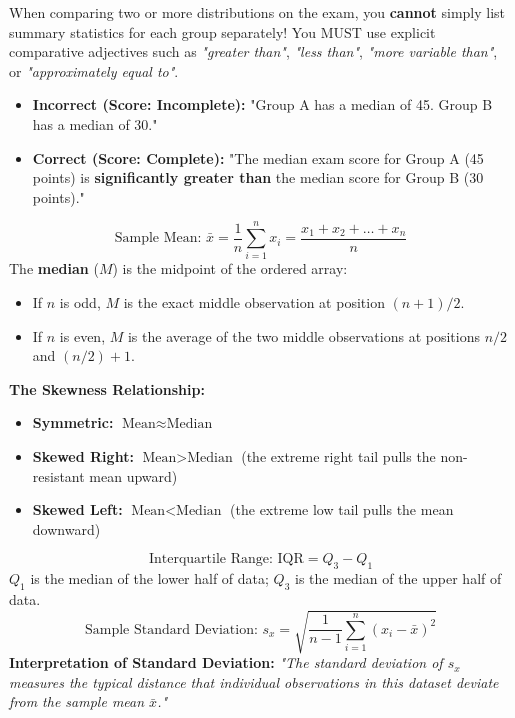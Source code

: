 \begin{trapbox}
When comparing two or more distributions on the exam, you \textbf{cannot} simply list summary statistics for each group separately! You MUST use explicit comparative adjectives such as \textit{"greater than"}, \textit{"less than"}, \textit{"more variable than"}, or \textit{"approximately equal to"}.
\begin{itemize}[leftmargin=1.2em]
  \item \textbf{Incorrect (Score: Incomplete):} "Group A has a median of 45. Group B has a median of 30."
  \item \textbf{Correct (Score: Complete):} "The median exam score for Group A (45 points) is \textbf{significantly greater than} the median score for Group B (30 points)."
\end{itemize}
\end{trapbox}

\begin{lessonbox}
\begin{equation}
  \text{Sample Mean: } \bar{x} = \frac{1}{n} \sum_{i=1}^n x_i = \frac{x_1 + x_2 + \dots + x_n}{n}
\end{equation}
The \textbf{median} ($M$) is the midpoint of the ordered array:
\begin{itemize}[leftmargin=1.2em]
  \item If $n$ is odd, $M$ is the exact middle observation at position $(n+1)/2$.
  \item If $n$ is even, $M$ is the average of the two middle observations at positions $n/2$ and $(n/2)+1$.
\end{itemize}
\textbf{The Skewness Relationship:}
\begin{itemize}[leftmargin=1.2em]
  \item \textbf{Symmetric:} $\text{Mean} \approx \text{Median}$
  \item \textbf{Skewed Right:} $\text{Mean} > \text{Median}$ (the extreme right tail pulls the non-resistant mean upward)
  \item \textbf{Skewed Left:} $\text{Mean} < \text{Median}$ (the extreme low tail pulls the mean downward)
\end{itemize}
\end{lessonbox}

\begin{lessonbox}
\begin{equation}
  \text{Interquartile Range: } \text{IQR} = Q_3 - Q_1
\end{equation}
$Q_1$ is the median of the lower half of data; $Q_3$ is the median of the upper half of data.
\begin{equation}
  \text{Sample Standard Deviation: } s_x = \sqrt{\frac{1}{n-1}\sum_{i=1}^n (x_i - \bar{x})^2}
\end{equation}
\textbf{Interpretation of Standard Deviation:} \textit{"The standard deviation of $s_x$ measures the typical distance that individual observations in this dataset deviate from the sample mean $\bar{x}$."}
\end{lessonbox}


